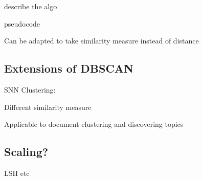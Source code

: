 describe the algo \cite{ester1996density}


pseudocode 

Can be adapted to take similarity measure instead of distance


\subsection{Extensions of DBSCAN}

SNN Clustering: \cite{ertoz2003finding}

Different similarity measure

Applicable to document clustering and discovering topics \cite{ertoz2004finding}



\subsection{Scaling?}

LSH etc
